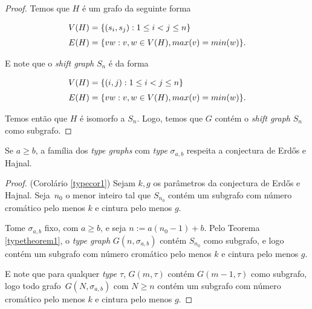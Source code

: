 \begin{proof}
Temos que $H$ é um grafo da seguinte forma

\begin{equation*}
\setlength{\jot}{6pt}
\begin{aligned}
V(H) &= \{(s_i,s_j) : 1\leq i<j\leq n\}\\
E(H) &= \{vw : v,w\in V(H), max(v) = min(w)\}.
\end{aligned}
\end{equation*}



E note que o \textit{shift graph} $S_n$ é da forma

\begin{equation*}
\setlength{\jot}{6pt}
\begin{aligned}
V(H) &= \{(i,j) : 1\leq i<j\leq n\}\\
E(H) &= \{vw : v,w\in V(H), max(v) = min(w)\}.
\end{aligned}
\end{equation*}

Temos então que $H$ é isomorfo a $S_n$. Logo, temos que $G$ contém o \textit{shift graph} $S_n$ como subgrafo.
\end{proof}

\begin{corolario}\label{typecor1}
Se $a\geq b$, a família dos \textit{type graphs} com \textit{type} $\sigma_{a,b}$ respeita a conjectura de Erd\H{o}s e Hajnal.
\end{corolario}

\begin{proof}(Corolário \ref{typecor1})
Sejam $k,g$ os parâmetros da conjectura de Erd\H{o}s e Hajnal. Seja~$n_0$ o menor inteiro tal que $S_{n_0}$ contém um subgrafo com número cromático pelo menos $k$ e cintura pelo menos $g$.

Tome $\sigma_{a,b}$ fixo, com $a\geq b$, e seja $n := a(n_0-1)+b$. Pelo Teorema \ref{typetheorem1}, o \textit{type graph} $G(n,\sigma_{a,b})$ contém $S_{n_0}$ como subgrafo, e logo contém um subgrafo com número cromático pelo menos $k$ e cintura pelo menos $g$.

E note que para qualquer \textit{type} $\tau$, $G(m,\tau)$ contém $G(m-1,\tau)$ como subgrafo, logo todo grafo~$G(N,\sigma_{a,b})$ com $N \geq n$ contém um subgrafo com número cromático pelo menos $k$ e cintura pelo menos $g$.
\end{proof}

